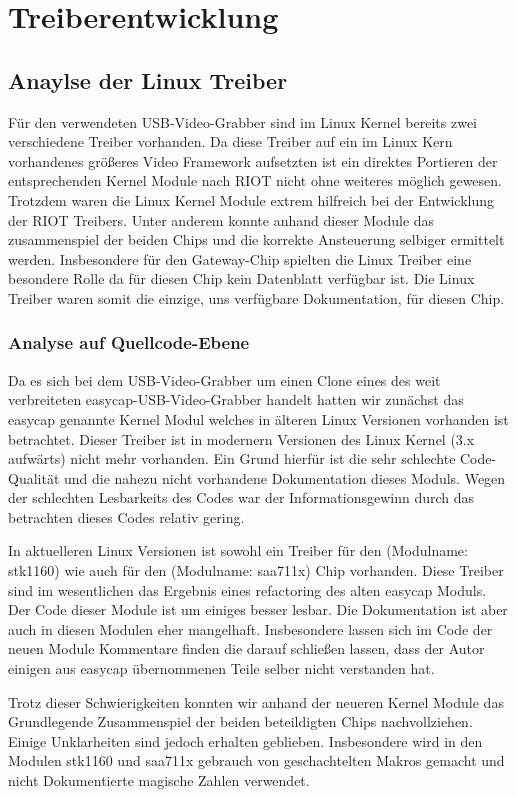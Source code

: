\section{Treiberentwicklung}
\subsection{Anaylse der Linux Treiber}
Für den verwendeten USB-Video-Grabber sind im Linux Kernel bereits zwei 
verschiedene Treiber vorhanden. Da diese Treiber auf ein im Linux Kern 
vorhandenes größeres Video Framework aufsetzten ist ein direktes Portieren der 
entsprechenden Kernel Module nach RIOT nicht ohne weiteres möglich gewesen.
Trotzdem waren die Linux Kernel Module extrem hilfreich bei der Entwicklung
der RIOT Treibers. Unter anderem konnte anhand dieser Module das zusammenspiel
der beiden Chips und die korrekte Ansteuerung selbiger ermittelt werden.
Insbesondere für den Gateway-Chip \stk{} spielten die Linux Treiber eine
besondere Rolle da für diesen Chip kein Datenblatt verfügbar ist. Die Linux 
Treiber waren somit die einzige, uns verfügbare Dokumentation, für diesen Chip. 

\subsubsection{Analyse auf Quellcode-Ebene}
Da es sich bei dem USB-Video-Grabber um einen Clone eines des weit verbreiteten
easycap-USB-Video-Grabber handelt hatten wir zunächst das easycap genannte Kernel
Modul welches in älteren Linux Versionen vorhanden ist betrachtet. Dieser Treiber
ist in modernern Versionen des Linux Kernel (3.x aufwärts) nicht mehr vorhanden.
Ein Grund hierfür ist die sehr schlechte Code-Qualität und die nahezu
nicht vorhandene Dokumentation dieses Moduls. Wegen der schlechten Lesbarkeits des
Codes war der Informationsgewinn durch das betrachten dieses Codes relativ gering.

In aktuelleren Linux Versionen ist sowohl ein Treiber für den \stk{} (Modulname: stk1160) 
wie auch für den \saa{} (Modulname: saa711x) Chip vorhanden. Diese Treiber sind im wesentlichen 
das Ergebnis eines refactoring des alten easycap Moduls. Der Code dieser Module ist um einiges 
besser lesbar. Die Dokumentation ist aber auch in diesen Modulen eher mangelhaft. Insbesondere 
lassen sich im Code der neuen Module Kommentare finden die darauf schließen lassen, dass der 
Autor einigen aus easycap übernommenen Teile selber nicht verstanden hat.

Trotz dieser Schwierigkeiten konnten wir anhand der neueren Kernel Module das Grundlegende 
Zusammenspiel der beiden beteildigten Chips nachvollziehen. Einige Unklarheiten sind jedoch
erhalten geblieben. Insbesondere wird in den Modulen stk1160 und saa711x gebrauch von
geschachtelten Makros gemacht und nicht Dokumentierte magische Zahlen verwendet. 

